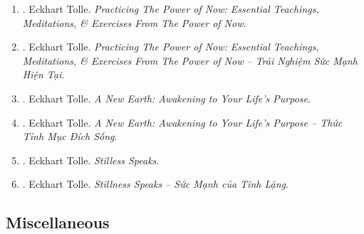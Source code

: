 \documentclass{article}
\begin{document}
\begin{enumerate}
	\item \cite{Tolle_practice_now}. {\sc Eckhart Tolle}. {\it Practicing The Power of Now: Essential Teachings, Meditations, \& Exercises From The Power of Now}.
	
	\item \cite{Tolle_practice_now_VN}. {\sc Eckhart Tolle}. {\it Practicing The Power of Now: Essential Teachings, Meditations, \& Exercises From The Power of Now -- Trải Nghiệm Sức Mạnh Hiện Tại}.\hfill{\sf[done]}
	
	\item \cite{Tolle_earth}. {\sc Eckhart Tolle}. {\it A New Earth: Awakening to Your Life's Purpose}.
	
	\item \cite{Tolle_earth_VN}. {\sc Eckhart Tolle}. {\it A New Earth: Awakening to Your Life's Purpose -- Thức Tỉnh Mục Đích Sống}.\hfill{\sf[done]}
	
	\item \cite{Tolle_stillness}. {\sc Eckhart Tolle}. {\it Stilless Speaks}.	
	
	\item \cite{Tolle_stillness_VN}. {\sc Eckhart Tolle}. {\it Stillness Speaks -- Sức Mạnh của Tĩnh Lặng}.\hfill{\sf[done]}
\end{enumerate}


\subsection{Miscellaneous}
\end{document}
